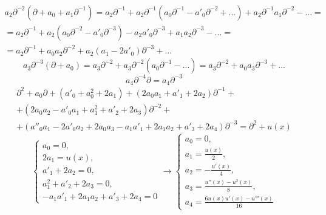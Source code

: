 \documentclass[12pt]{article}
\theoremstyle{definition}
\begin{document}
\begin{enumerate}
\begin{itemize}
\begin{multline}
        \end{multline}
        \begin{multline}
            a_2\partial^{-2}(\partial+a_0+a_1\partial^{-1})=a_2\partial^{-1}+a_2\partial^{-1}(a_0\partial^{-1}-a'_0\partial^{-2}+...)+a_2\partial^{-1}a_1\partial^{-2}-...=\\=a_2\partial^{-1}+a_2(a_0\partial^{-2}-a'_0\partial^{-3})-a_2a'_0\partial^{-3}+a_1a_2\partial^{-3}-...=\\=a_2\partial^{-1}+a_0a_2\partial^{-2}+a_2(a_1-2a'_0)\partial^{-3}+...
        \end{multline}
        \begin{equation}
            a_3\partial^{-3}(\partial+a_0)=a_3\partial^{-2}+a_3\partial^{-2}(a_0\partial^{-1}-...)=a_3\partial^{-2}+a_0a_3\partial^{-3}+...
        \end{equation}
        \begin{equation}
            a_4\partial^{-4}\partial=a_4\partial^{-3}
        \end{equation}
        \begin{multline}
            \partial^2+a_0\partial+(a'_0+a_0^2+2a_1)+(2a_0a_1+a'_1+2a_2)\partial^{-1}+\\+(2a_0a_2-a'_0a_1+a^2_1+a'_2+2a_3)\partial^{-2}+\\+(a''_0a_1-2a'_0a_2+2a_0a_3-a_1a'_1+2a_1a_2+a'_3+2a_4)\partial^{-3}=\partial^2+u(x)
        \end{multline}
        \begin{equation}
            \begin{cases}
                a_0=0,\\
                2a_1=u(x),\\
                a'_1+2a_2=0,\\
                a_1^2+a'_2+2a_3=0,\\
                -a_1a'_1+2a_1a_2+a'_3+2a_4=0
            \end{cases}\rightarrow
            \begin{cases}
                a_0=0,\\
                a_1=\frac{u(x)}{2},\\
                a_2=-\frac{u'(x)}{4},\\
                a_3=\frac{u''(x)-u^2(x)}{8},\\
                a_4=\frac{6u(x)u'(x)-u'''(x)}{16}
            \end{cases}
        \end{equation}
        \begin{equation}

\end{equation}
\end{itemize}
\end{enumerate}
\end{document}
